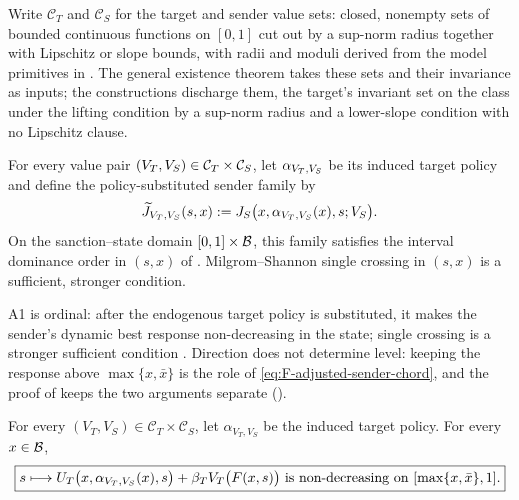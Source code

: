 Write $\mathcal C_T$ and $\mathcal C_S$ for the target and sender value
sets: closed, nonempty sets of bounded continuous functions on
$[0,1]$ cut out by a sup-norm radius together with Lipschitz or slope bounds,
with radii and moduli derived from the model primitives in
. The general existence theorem takes these
sets and their invariance as inputs; the constructions discharge
them, the target's invariant set on the class under the lifting condition by a sup-norm radius and a lower-slope
condition with no Lipschitz clause.

\begin{assumption}
\label{ass:sender}
For every value pair
$(V_T,V_S)\in\mathcal C_T\times\mathcal C_S$, let
$\alpha_{V_T,V_S}$ be its induced target policy and define the
policy-substituted sender family by
\begin{equation}
\widetilde J_{V_T,V_S}(s,x)
:=
J_S\bigl(x,\alpha_{V_T,V_S}(x),s;V_S\bigr).
\label{eq:sender-policy-substituted}
\end{equation}
On the sanction--state domain $[0,1]\times\mathcal{B}$, this family
satisfies the interval dominance order in $(s,x)$ of
\citet{QuahStrulovici2009}. Milgrom--Shannon single crossing in
$(s,x)$ is a sufficient, stronger condition.
\end{assumption}

A1 is ordinal: after the endogenous target policy is substituted, it makes the
sender's dynamic best response non-decreasing in the state; single crossing is a
stronger sufficient condition \citep{MilgromShannon1994}. Direction does not
determine level: keeping the response above $\max\{x,\bar x\}$ is the role of
\eqref{eq:F-adjusted-sender-chord}, and the proof of  keeps the two
arguments separate ().

\begin{assumption}
\label{ass:target}
For every $(V_T,V_S)\in\mathcal C_T\times\mathcal C_S$, let
$\alpha_{V_T,V_S}$ be the induced target policy. For every
$x\in\mathcal{B}$,
\begin{equation}
\boxed{
 s\longmapsto
 U_T\bigl(x,\alpha_{V_T,V_S}(x),s\bigr)
 +\beta_TV_T\bigl(F(x,s)\bigr)
 \text{ is non-decreasing on }[\max\{x,\bar x\},1].
}
\label{eq:A2}
\end{equation}
\end{assumption}


